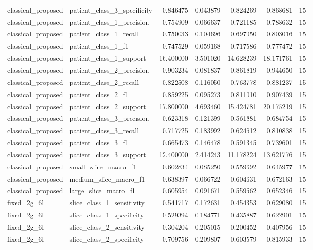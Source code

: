 \begin{tabular}{llrrrrr}
classical_proposed & patient_class_3_specificity & 0.846475 & 0.043879 & 0.824269 & 0.868681 & 15 \\
classical_proposed & patient_class_1_precision & 0.754909 & 0.066637 & 0.721185 & 0.788632 & 15 \\
classical_proposed & patient_class_1_recall & 0.750033 & 0.104696 & 0.697050 & 0.803016 & 15 \\
classical_proposed & patient_class_1_f1 & 0.747529 & 0.059168 & 0.717586 & 0.777472 & 15 \\
classical_proposed & patient_class_1_support & 16.400000 & 3.501020 & 14.628239 & 18.171761 & 15 \\
classical_proposed & patient_class_2_precision & 0.903234 & 0.081837 & 0.861819 & 0.944650 & 15 \\
classical_proposed & patient_class_2_recall & 0.822508 & 0.116050 & 0.763778 & 0.881237 & 15 \\
classical_proposed & patient_class_2_f1 & 0.859225 & 0.095273 & 0.811010 & 0.907439 & 15 \\
classical_proposed & patient_class_2_support & 17.800000 & 4.693460 & 15.424781 & 20.175219 & 15 \\
classical_proposed & patient_class_3_precision & 0.623318 & 0.121399 & 0.561881 & 0.684754 & 15 \\
classical_proposed & patient_class_3_recall & 0.717725 & 0.183992 & 0.624612 & 0.810838 & 15 \\
classical_proposed & patient_class_3_f1 & 0.665473 & 0.146478 & 0.591345 & 0.739601 & 15 \\
classical_proposed & patient_class_3_support & 12.400000 & 2.414243 & 11.178224 & 13.621776 & 15 \\
classical_proposed & small_slice_macro_f1 & 0.602834 & 0.085250 & 0.559692 & 0.645977 & 15 \\
classical_proposed & medium_slice_macro_f1 & 0.638397 & 0.066722 & 0.604631 & 0.672163 & 15 \\
classical_proposed & large_slice_macro_f1 & 0.605954 & 0.091671 & 0.559562 & 0.652346 & 15 \\
fixed_2g_6l & slice_class_1_sensitivity & 0.541717 & 0.172631 & 0.454353 & 0.629080 & 15 \\
fixed_2g_6l & slice_class_1_specificity & 0.529394 & 0.184771 & 0.435887 & 0.622901 & 15 \\
fixed_2g_6l & slice_class_2_sensitivity & 0.304204 & 0.205015 & 0.200452 & 0.407956 & 15 \\
fixed_2g_6l & slice_class_2_specificity & 0.709756 & 0.209807 & 0.603579 & 0.815933 & 15 \\

\end{tabular}
